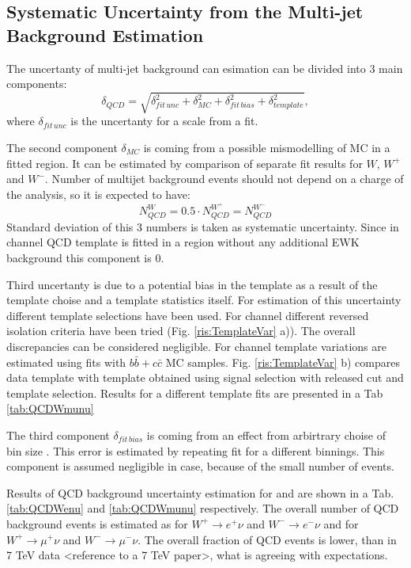 \subsection{Systematic Uncertainty from the Multi-jet Background Estimation }\label{sec:QCDUnc}

The uncertanty of multi-jet background can esimation can be divided into 3 main components:
\begin{equation}
\delta_{QCD} = \sqrt{ \delta_{fit\, unc}^{2}+\delta_{MC}^{2}+\delta_{fit\, bias}^{2}+\delta_{template}^{2}}, 
\end{equation}
where $\delta_{fit\, unc}$ is the uncertanty for a scale from a \chiD fit. 

The second component $\delta_{MC}$ is coming from a possible mismodelling of MC in a fitted region. It can be estimated by comparison of separate fit results for $W$, $W^{+}$ and $W^{-}$. Number of multijet background events should not depend on a charge of the analysis, so it is expected to have:
\begin{equation}
N_{QCD}^{W}=0.5 \cdot N_{QCD}^{W^{+}} =N_{QCD}^{W^{-}}
\end{equation}
Standard deviation of this 3 numbers is taken as systematic uncertainty. Since in \wmunu channel QCD template is fitted in a region without any additional EWK background this component is 0.

Third uncertanty is due to a potential bias in the template as a result of the template choise and a template statistics itself. For estimation of this uncertainty different template selections have been used. For \wenu channel different reversed isolation criteria have been tried (Fig. \ref{ris:TemplateVar} a)). The overall discrepancies can be considered negligible. For \wmunu channel template variations are estimated using fits with $b\bar{b}+c\bar{c}$ MC samples.  Fig. \ref{ris:TemplateVar} b) compares data template with template obtained using signal selection with released \mtw cut and template selection. Results for a different template fits are presented in a Tab \ref{tab:QCDWmunu}

The third component $\delta_{fit\, bias}$ is coming from an effect from arbirtrary choise of bin size . This error is estimated by repeating fit for a different binnings. This component is assumed negligible in \wmunu case, because of the small number of events. 

Results of QCD background uncertainty estimation for \wenu and \wmunu are shown in a Tab. \ref{tab:QCDWenu} and \ref{tab:QCDWmunu} respectively. The overall number of QCD background events is estimated as \nQCDWplusenu  for $W^{+}\to e^{+}\nu$ and $W^{-}\to e^{-}\nu$ and \nQCDWplusmunu for $W^{+}\to \mu^{+}\nu$ and $W^{-}\to \mu^{-}\nu$. The overall fraction of QCD events is lower, than in 7 TeV data <reference to a 7 TeV paper>, what is agreeing with expectations.

